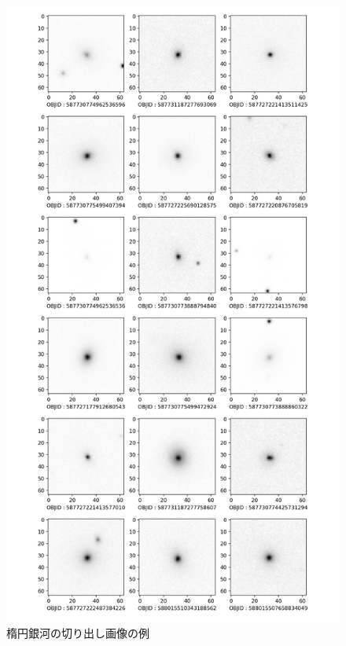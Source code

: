 \documentclass[a4j, 11pt]{jreport}
\begin{document}
\newpage
\begin{figure}[H]
  \centering
  \includegraphics[width=0.5\vsize, keepaspectratio]{images/syuron_4syou_sdss_imgs/elliptical_mini.png}
  \caption{楕円銀河の切り出し画像の例}
  \label{fig:sdss_images_elliptical}
\end{figure}
\end{document}
